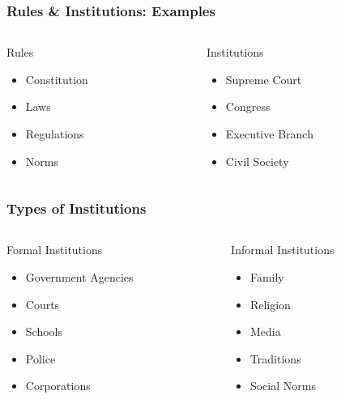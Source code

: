 \documentclass[10pt]{beamer}
\begin{document}
\begin{frame}
\frametitle{Rules \& Institutions: Examples}

\begin{columns}
\begin{column}{0.48\textwidth}
\begin{block}{Rules}
\pause
\begin{itemize}
\item Constitution
\item Laws
\item Regulations
\item Norms
\end{itemize}
\end{block}
\end{column}

\begin{column}{0.48\textwidth}
\begin{block}{Institutions}
\pause
\begin{itemize}
\item Supreme Court
\item Congress
\item Executive Branch
\item Civil Society
\end{itemize}
\end{block}
\end{column}
\end{columns}

\end{frame}

\begin{frame}
\frametitle{Types of Institutions}

\begin{columns}
\begin{column}{0.48\textwidth}
\begin{block}{Formal Institutions}
\pause
\begin{itemize}
\item Government Agencies
\item Courts
\item Schools
\item Police
\item Corporations
\end{itemize}
\end{block}
\end{column}

\begin{column}{0.48\textwidth}
\begin{block}{Informal Institutions}
\pause
\begin{itemize}
\item Family
\item Religion
\item Media
\item Traditions
\item Social Norms
\end{itemize}
\end{block}
\end{column}
\end{columns}

\end{frame}
\end{document}
